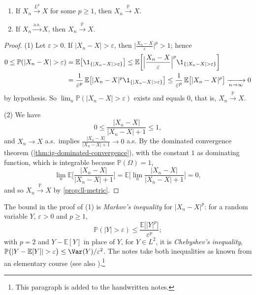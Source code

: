 \begin{theorem}\label{thm:ll-implications}
\leavevmode
\begin{enumerate}[label=(\arabic*)]
  \item If $X_n\xrightarrow{L^p}X$ for some $p\ge1$, then $X_n\xrightarrow{\mathbb P}X$.
  \item If $X_n\xrightarrow{\text{a.s.}}X$, then $X_n\xrightarrow{\mathbb P}X$.
\end{enumerate}
\end{theorem}

\begin{proof}
(1) Let $\varepsilon>0$. If $|X_n-X|>\varepsilon$, then $\big|\frac{X_n-X}\varepsilon\big|^p>1$;
hence
\[
\begin{aligned}
  0\le\mathbb P(|X_n-X|>\varepsilon)&=\mathbb E\big[\1_{\{|X_n-X|>\varepsilon\}}\big]
  \le\mathbb E\bigg[\Big|\frac{X_n-X}{\varepsilon}\Big|^p\1_{\{|X_n-X|>\varepsilon\}}\bigg]\\
  &=\frac1{\varepsilon^p}\,\mathbb E\big[|X_n-X|^p\1_{\{|X_n-X|>\varepsilon\}}\big]
  \le\frac1{\varepsilon^p}\,\mathbb E\big[|X_n-X|^p\big]\xrightarrow[n\to\infty]{}0
\end{aligned}
\]
by hypothesis. So $\lim_n\mathbb P(|X_n-X|>\varepsilon)$ exists and equals $0$, that is,
$X_n\xrightarrow{\mathbb P}X$.

(2) We have
\[
  0\le\frac{|X_n-X|}{|X_n-X|+1}\le1,
\]
and $X_n\to X$ a.s.\ implies $\frac{|X_n-X|}{|X_n-X|+1}\to0$ a.s. By the dominated convergence
theorem (\cref{thm:ig-dominated-convergence}), with the constant $1$ as dominating function,
which is integrable because $\mathbb P(\Omega)=1$,
\[
  \lim_n\mathbb E\bigg[\frac{|X_n-X|}{|X_n-X|+1}\bigg]
  =\mathbb E\bigg[\lim_n\frac{|X_n-X|}{|X_n-X|+1}\bigg]=0 ,
\]
and so $X_n\xrightarrow{\mathbb P}X$ by \cref{prop:ll-metric}.
\end{proof}

The bound in the proof of (1) is \emph{Markov's inequality} for $|X_n-X|^p$: for a random
variable $Y$, $\varepsilon>0$ and $p\ge1$,
\begin{equation}\label{eq:ll-markov}
  \mathbb P(|Y|>\varepsilon)\le\frac{\mathbb E\big[|Y|^p\big]}{\varepsilon^p} ;
\end{equation}
with $p=2$ and $Y-\mathbb E[Y]$ in place of $Y$, for $Y\in L^2$, it is \emph{Chebyshev's
inequality}, $\mathbb P\big(|Y-\mathbb E[Y]|>\varepsilon\big)\le\Var(Y)/\varepsilon^2$. The notes
take both inequalities as known from an elementary course (see also
\citealp[Section~1.6.1]{durrett}).\footnote{This paragraph is added to the handwritten notes.}

